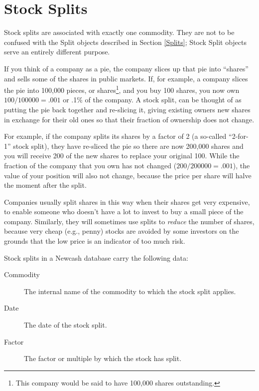 \documentclass{report}
\begin{document}
\section{Stock Splits}
Stock splits are associated with exactly one commodity. They are not to be confused with the Split objects described in Section \ref{Splits}; Stock Split objects serve an entirely different purpose.

If you think of a company as a pie, the company slices up that pie into ``shares'' and sells some of the shares in public markets. If, for example, a company slices the pie into 100,000 pieces, or shares\footnote{This company would be said to have 100,000 shares outstanding.}, and you buy 100 shares, you now own $100/100000=.001$ or .1\% of the company. A stock split, can be thought of as putting the pie back together and re-slicing it, giving existing owners new shares in exchange for their old ones so that their fraction of ownership does not change.

For example, if the company splits its shares by a factor of 2 (a so-called ``2-for-1'' stock split), they have re-sliced the pie so there are now 200,000 shares and you will receive 200 of the new shares to replace your original 100. While the fraction of the company that you own has not changed ($200/200000=.001$), the value of your position will also not change, because the price per share will halve the moment after the split.

Companies usually split shares in this way when their shares get very expensive, to enable someone who doesn't have a lot to invest to buy a small piece of the company. Similarly, they will sometimes use splits to \emph{reduce} the number of shares, because very cheap (e.g., penny) stocks are avoided by some investors on the grounds that the low price is an indicator of too much risk. 

Stock splits in a Newcash database carry the following data:

\begin{description}
\item [Commodity] The internal name of the commodity to which the stock split applies.
\item [Date] The date of the stock split.
\item [Factor] The factor or multiple by which the stock has split.
\end{description}
\end{document}
